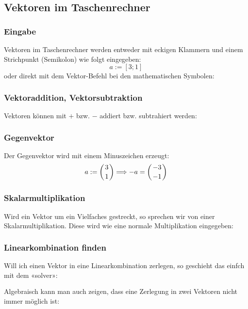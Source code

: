 \subsection{Vektoren im Taschenrechner}

\subsubsection{Eingabe}
Vektoren im Taschenrechner werden entweder mit eckigen Klammern und
einem Strichpunkt (Semikolon) wie folgt eingegeben:
$$a := [3; 1]$$
oder direkt mit dem Vektor-Befehl bei den mathematischen Symbolen:


\subsubsection{Vektoraddition, Vektorsubtraktion}
Vektoren können mit $+$ bzw. $-$ addiert bzw. subtrahiert
werden:

\subsubsection{Gegenvektor}
Der Gegenvektor wird mit einem Minuszeichen erzeugt:
$$a:=\left(3\atop 1\right) \Longrightarrow -a = \left( -3 \atop -1\right)$$

\subsubsection{Skalarmultiplikation}
Wird ein Vektor um ein Vielfaches gestreckt, so sprechen wir von einer
Skalarmultiplikation. Diese wird wie eine normale Multiplikation
eingegeben:


\subsubsection{Linearkombination finden}
Will ich einen Vektor in eine Linearkombination
 zerlegen, so geschieht das einfch mit dem
«solver»:

Algebraisch kann man auch zeigen, dass eine Zerlegung in zwei Vektoren
nicht immer möglich ist:

\newpage
